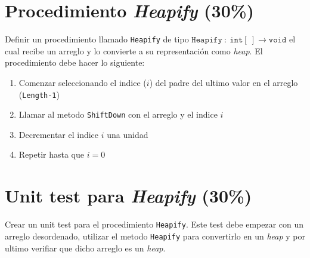 \documentclass{article}
\begin{document}
\section*{Procedimiento \emph{Heapify} (30\%)}
Definir un procedimiento llamado \texttt{Heapify}\cite{HeapSort} de tipo $\mathtt{Heapify}\ :\ \mathtt{int}[\ ]
\rightarrow \mathtt{void}$ el cual recibe un arreglo y lo convierte a su representaci\'on como
\emph{heap}. El procedimiento debe hacer lo siguiente:
\begin{enumerate}
        \item{Comenzar seleccionando el indice ($i$) del padre del ultimo valor en el arreglo (\texttt{Length-1})}
        \item{Llamar al metodo \texttt{ShiftDown} con el arreglo y el indice $i$}
        \item{Decrementar el indice $i$ una unidad}
        \item{Repetir hasta que $i=0$}
\end{enumerate}

\section*{Unit test para \emph{Heapify} (30\%)}
Crear un unit test para el procedimiento \texttt{Heapify}. Este test debe empezar con
un arreglo desordenado, utilizar el metodo \texttt{Heapify} para convertirlo en un \emph{heap}
y por ultimo verifiar que dicho arreglo es un \emph{heap}.



\end{document}
